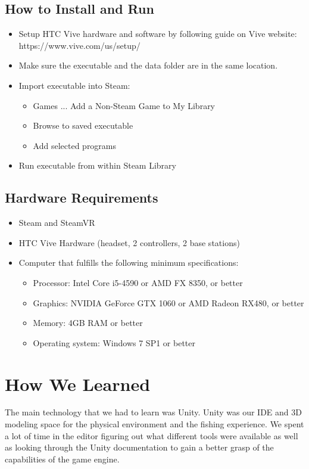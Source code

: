 \documentclass[10pt,journal,compsoc,onecolumn, draftclsnofoot]{IEEEtran}
\begin{document}
\subsection{How to Install and Run}
\begin{itemize}
  \item Setup HTC Vive hardware and software by following guide on Vive website: https://www.vive.com/us/setup/
  \item Make sure the executable and the data folder are in the same location.
  \item Import executable into Steam:
  \begin{itemize}
    \item Games ... Add a Non-Steam Game to My Library
    \item Browse to saved executable
    \item Add selected programs
  \end{itemize}
  \item Run executable from within Steam Library
\end{itemize}

\subsection{Hardware Requirements}
\begin{itemize}
  \item Steam and SteamVR
  \item HTC Vive Hardware (headset, 2 controllers, 2 base stations)
  \item Computer that fulfills the following minimum specifications:
  \begin{itemize}
    \item Processor: Intel Core i5-4590 or AMD FX 8350, or better
    \item Graphics: NVIDIA GeForce GTX 1060 or AMD Radeon RX480, or better
    \item Memory: 4GB RAM or better
    \item Operating system: Windows 7 SP1 or better
  \end{itemize}
\end{itemize}



\section{How We Learned}
The main technology that we had to learn was Unity. Unity was our IDE and 3D modeling space for the physical environment and the fishing experience. We spent a lot of time in the editor figuring out what different tools were available as well as looking through the Unity documentation to gain a better grasp of the capabilities of the game engine.
\end{document}
